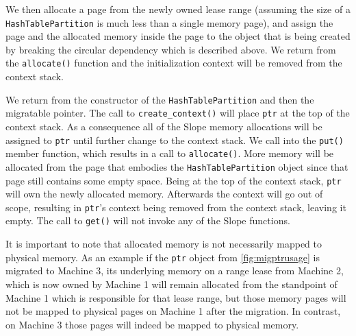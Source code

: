 We then allocate a page from the newly owned lease range (assuming the size of
a \texttt{HashTablePartition} is much less than a single memory page), and assign the
page and the allocated memory inside the page to the object that is being
created by breaking the circular dependency which is described above.
We return from the \texttt{allocate()} function and the initialization context
will be removed from the context stack.

We return from the constructor of the \texttt{HashTablePartition} and then
the migratable pointer. The call to \texttt{create\_context()} will place
\texttt{ptr} at the top of the context stack. As a consequence all of the
Slope memory allocations will be assigned to \texttt{ptr} until further change
to the context stack. We call into the \texttt{put()} member function, which
results in a call to \texttt{allocate()}. More memory will be allocated from
the page that embodies the \texttt{HashTablePartition} object since that page
still contains some empty space. Being at the top of the context stack,
\texttt{ptr} will own the newly allocated memory. Afterwards the context will
go out of scope, resulting in \texttt{ptr}'s context being removed from the
context stack, leaving it empty. 
The call to \texttt{get()} will not invoke any of the Slope functions.

It is important to note that allocated memory is not necessarily mapped to
physical memory. As an example if the \texttt{ptr} object from
\autoref{fig:migptrusage} is migrated to Machine 3, its underlying memory
on a range lease from Machine 2, which is now owned by Machine 1 will remain
allocated from the standpoint of Machine 1 which is responsible for that lease
range, but those memory pages will not be mapped to physical pages on Machine 1
after the migration.
In contrast, on Machine 3 those pages will indeed be mapped to
physical memory.

% 




